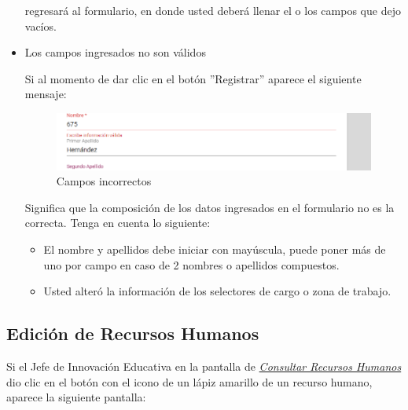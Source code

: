 \begin{itemize}
                         regresará al formulario, en donde usted deberá llenar el o los campos que dejo vacíos.

                    \item Los campos ingresados no son válidos

                        Si al momento de dar clic en el botón ''Registrar'' aparece el siguiente mensaje:
                         \begin{figure}[H]
                            \centering
                            \includegraphics[width=0.4\linewidth]{images/SP1/MSG35}
                            \caption{Campos incorrectos}
                            \label{mensaje35}

                        \end{figure}

                        Significa que la composición de los datos ingresados en el formulario no es la correcta. Tenga en cuenta lo siguiente:

                        \begin{itemize}
                            \item El nombre y apellidos debe iniciar con mayúscula, puede poner más de uno por campo en caso de 2 nombres o apellidos compuestos.
                            \item Usted alteró la información de los selectores de cargo o zona de trabajo.
                        \end{itemize}

                \end{itemize}

\newpage

            \hypertarget{editar-RH}{}
            \subsection{Edición de Recursos Humanos}
                Si el Jefe de Innovación Educativa en la pantalla de \hyperlink{consultarRH}{\textit{Consultar Recursos Humanos}} dio clic en el botón con el icono de un lápiz amarillo de un recurso humano, aparece la siguiente pantalla:

